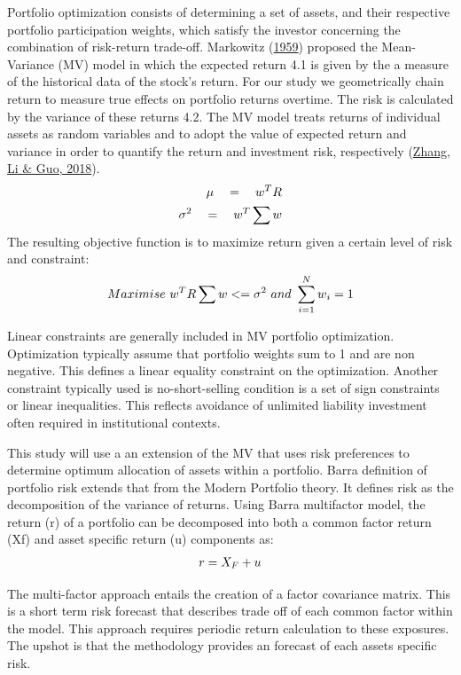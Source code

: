 \documentclass[11pt,preprint, authoryear]{elsarticle}
\numberwithin{equation}{section}
\numberwithin{figure}{section}
\numberwithin{table}{section}
\begin{document}
Portfolio optimization consists of determining a set of assets, and
their respective portfolio participation weights, which satisfy the
investor concerning the combination of risk-return trade-off. Markowitz
(\protect\hyperlink{ref-markowitz1959portfolio}{1959}) proposed the
Mean-Variance (MV) model in which the expected return 4.1 is given by
the a measure of the historical data of the stock's return. For our
study we geometrically chain return to measure true effects on portfolio
returns overtime. The risk is calculated by the variance of these
returns 4.2. The MV model treats returns of individual assets as random
variables and to adopt the value of expected return and variance in
order to quantify the return and investment risk, respectively
(\protect\hyperlink{ref-zhang2018portfolio}{Zhang, Li \& Guo, 2018}).
\begin{align}
\mu \quad = \quad w^TR \\ \notag
\sigma^2 \quad  = \quad w^T\sum \notag
w\end{align} The resulting objective function is to maximize return
given a certain level of risk and constraint: \begin{align}
Maximise \ w^TR \sum w<=\sigma^2\ and\ \sum_{i = 1}^{N}w{_i}=1 \notag
\end{align}

Linear constraints are generally included in MV portfolio optimization.
Optimization typically assume that portfolio weights sum to 1 and are
non negative. This defines a linear equality constraint on the
optimization. Another constraint typically used is no-short-selling
condition is a set of sign constraints or linear inequalities. This
reflects avoidance of unlimited liability investment often required in
institutional contexts.

This study will use a an extension of the MV that uses risk preferences
to determine optimum allocation of assets within a portfolio. Barra
definition of portfolio risk extends that from the Modern Portfolio
theory. It defines risk as the decomposition of the variance of returns.
Using Barra multifactor model, the return (r) of a portfolio can be
decomposed into both a common factor return (Xf) and asset specific
return (u) components as: \begin{align} 
r= X_{F} + u \notag
\end{align}

The multi-factor approach entails the creation of a factor covariance
matrix. This is a short term risk forecast that describes trade off of
each common factor within the model. This approach requires periodic
return calculation to these exposures. The upshot is that the
methodology provides an forecast of each assets specific risk.
\end{document}

